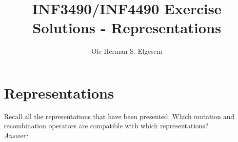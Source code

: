 
\title{\vspace{-2cm}INF3490/INF4490 Exercise Solutions - Representations}
\author{Ole Herman S. Elgesem}
\date{}

\setlength\parindent{0pt}


    \renewcommand\marginsymbol[1][0pt]{%
  \tabto*{0cm}\makebox[-1cm][c]{$\mathbb{P}$}\tabto*{\TabPrevPos}}

\maketitle


\section{Representations}
Recall all the representations that have been presented.
Which mutation and recombination operators are compatible with which representations?\\

\textit{Answer:}

